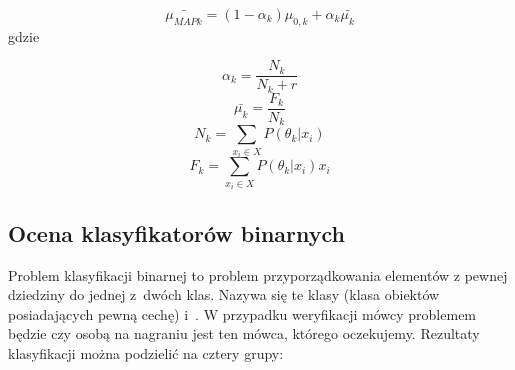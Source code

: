 $$\bar{\mu_{MAP k}} = (1 - \alpha_k) \mu_{0,k} + \alpha_k \bar{\mu_k}$$
gdzie

$$\alpha_k = \frac{N_k}{N_k + r}$$
$$\bar{\mu_k} = \frac{F_k}{N_k}$$
$$N_k = \sum_{x_i \in X} P(\theta_k | x_i)$$
$$F_k = \sum_{x_i \in X} P(\theta_k | x_i) x_i$$



%

%
%
%
%
%



\subsection{Ocena klasyfikatorów binarnych}

Problem klasyfikacji binarnej to problem przyporządkowania elementów z
pewnej dziedziny do jednej z~dwóch klas. Nazywa się te klasy
 (klasa obiektów posiadających pewną cechę) i~.
W przypadku weryfikacji mówcy problemem będzie czy osobą na nagraniu jest ten mówca, którego oczekujemy.
Rezultaty klasyfikacji można podzielić na cztery grupy:

